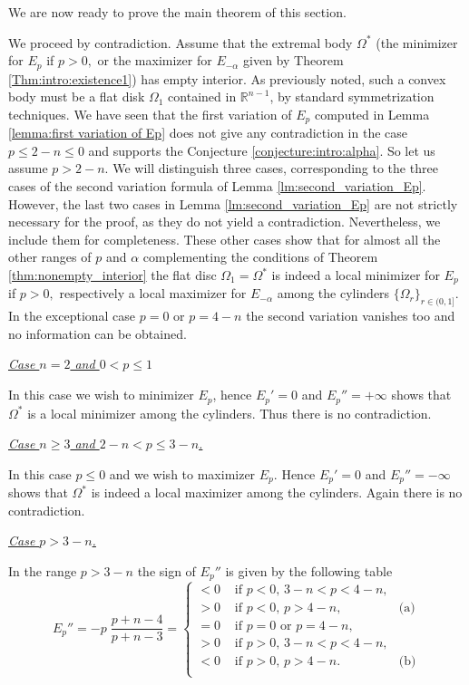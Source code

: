 \documentclass[10pt,leqno]{amsart}
\makeatletter
\newcommand{\R}[0]{\mathbb{R}}
\numberwithin{Theorem}{section}
\theoremstyle{definition}
\theoremstyle{remark}
\numberwithin{equation}{section}
\numberwithin{equation}{section}
\newenvironment{customproof}[1]{%
  \par\pushQED{\qed}%
  \normalfont\topsep6pt \trivlist
  \item[\hskip\labelsep\itshape
    Proof of #1\@addpunct{.}]\ignorespaces
}{%
  \popQED\endtrivlist\@endpefalse
}
\makeatother
\begin{document}
We are now ready to prove the main theorem of this section. 

\begin{customproof}{Theorem \ref{thm:nonempty_interior}}
We proceed by contradiction. Assume that the extremal body $\Omega^*$ (the minimizer for $E_p$ if $p>0,$  or the maximizer for $E_{-\alpha}$ given by Theorem \ref{Thm:intro:existence1}) has empty interior. As previously noted, such a convex body must be a flat disk $\Omega_1$ contained in $\R^{n-1}$, by standard symmetrization techniques. 
We have seen that the first variation of $E_p$ computed in Lemma \ref{lemma:first variation of Ep} does not give any contradiction in the case $p\leq 2-n \leq 0$ and supports the Conjecture \ref{conjecture:intro:alpha}. So let us assume $p>2-n.$ We will distinguish three cases, corresponding to the three cases of the second variation formula  of Lemma \ref{lm:second_variation_Ep}. However, the last two cases in Lemma \ref{lm:second_variation_Ep} are not strictly necessary for the proof, as they do not yield a contradiction. Nevertheless, we include them for completeness. These other cases show that for almost all the other ranges of $p$ and $\alpha$ complementing the conditions of Theorem 
 \ref{thm:nonempty_interior} the flat disc $\Omega_1=\Omega^*$ is indeed a local minimizer for $E_p$ if $p>0,$ respectively a local maximizer for $E_{-\alpha}$  among the cylinders $\{\Omega_r\}_{r\in (0,1]}$.  In the exceptional case $p=0$ or $p=4-n$ the second variation vanishes too and no information can be obtained. 
 
\textit{\underline{Case $n=2$ and $0<p\leq 1$}} 

In this case we wish to minimizer $E_p$, hence $E_p'=0$ and $E_p''=+\infty$ shows that $\Omega^*$ is a local minimizer among the cylinders. Thus there is no contradiction. 

\textit{\underline{Case $n\geq 3$ and $2-n<p\leq 3-n$.}} 

In this case $p\leq 0$ and we wish to maximizer $E_p$. Hence $E_p'=0$ and $E_p''=-\infty$ shows that $\Omega^*$ is indeed a local maximizer among the cylinders. Again there is no contradiction. 

\textit{\underline{Case $p>3-n$.}} 

In the range $p>3-n$ the sign of $E_p''$ is given by the following table 
$$
     E_p'' =-p \; \frac{p+n-4}{p+n-3}=\left\{ \begin{array}{clr}
              <0 & \text{ if } p <0, \, 3-n<p<4-n, & \\
              >0 & \text{ if } p <0,\, p>4-n, & \text{(a)} \\
              =0 & \text{ if } p=0 \text{ or } p=4-n,& \\
              >0 & \text{ if } p >0, \, 3-n<p<4-n,& \\
              <0 & \text{ if } p >0, \, p>4-n. & \text{(b)}\\
    \end{array}\right.
$$


\end{customproof}
\end{document}
